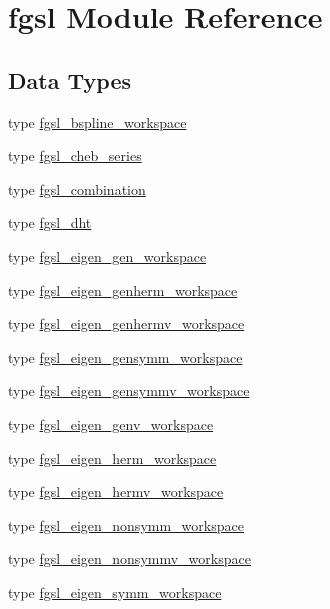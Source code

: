 \hypertarget{namespacefgsl}{}\section{fgsl Module Reference}
\label{namespacefgsl}
\subsection*{Data Types}
\begin{DoxyCompactItemize}
\item 
type \hyperlink{structfgsl_1_1fgsl__bspline__workspace}{fgsl\+\_\+bspline\+\_\+workspace}
\item 
type \hyperlink{structfgsl_1_1fgsl__cheb__series}{fgsl\+\_\+cheb\+\_\+series}
\item 
type \hyperlink{structfgsl_1_1fgsl__combination}{fgsl\+\_\+combination}
\item 
type \hyperlink{structfgsl_1_1fgsl__dht}{fgsl\+\_\+dht}
\item 
type \hyperlink{structfgsl_1_1fgsl__eigen__gen__workspace}{fgsl\+\_\+eigen\+\_\+gen\+\_\+workspace}
\item 
type \hyperlink{structfgsl_1_1fgsl__eigen__genherm__workspace}{fgsl\+\_\+eigen\+\_\+genherm\+\_\+workspace}
\item 
type \hyperlink{structfgsl_1_1fgsl__eigen__genhermv__workspace}{fgsl\+\_\+eigen\+\_\+genhermv\+\_\+workspace}
\item 
type \hyperlink{structfgsl_1_1fgsl__eigen__gensymm__workspace}{fgsl\+\_\+eigen\+\_\+gensymm\+\_\+workspace}
\item 
type \hyperlink{structfgsl_1_1fgsl__eigen__gensymmv__workspace}{fgsl\+\_\+eigen\+\_\+gensymmv\+\_\+workspace}
\item 
type \hyperlink{structfgsl_1_1fgsl__eigen__genv__workspace}{fgsl\+\_\+eigen\+\_\+genv\+\_\+workspace}
\item 
type \hyperlink{structfgsl_1_1fgsl__eigen__herm__workspace}{fgsl\+\_\+eigen\+\_\+herm\+\_\+workspace}
\item 
type \hyperlink{structfgsl_1_1fgsl__eigen__hermv__workspace}{fgsl\+\_\+eigen\+\_\+hermv\+\_\+workspace}
\item 
type \hyperlink{structfgsl_1_1fgsl__eigen__nonsymm__workspace}{fgsl\+\_\+eigen\+\_\+nonsymm\+\_\+workspace}
\item 
type \hyperlink{structfgsl_1_1fgsl__eigen__nonsymmv__workspace}{fgsl\+\_\+eigen\+\_\+nonsymmv\+\_\+workspace}
\item 
type \hyperlink{structfgsl_1_1fgsl__eigen__symm__workspace}{fgsl\+\_\+eigen\+\_\+symm\+\_\+workspace}

\end{DoxyCompactItemize}
